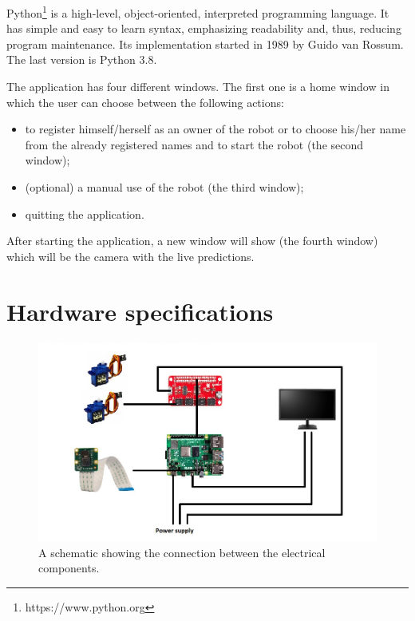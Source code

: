 \documentclass[runningheads,a4paper,12pt]{report}
\begin{document}
Python\footnote{https://www.python.org} is a high-level, object-oriented, interpreted programming language. It has simple and easy to learn syntax, emphasizing readability and, thus, reducing program maintenance. Its implementation started in 1989 by Guido van Rossum. The last version is Python 3.8.

The application has four different windows. The first one is a home window in which the user can choose between the following actions:

\begin{itemize}

\item to register himself/herself as an owner of the robot or to choose his/her name from the already registered names and to start the robot (the second window);

\item (optional) a manual use of the robot (the third window);

\item quitting the application.
\end{itemize}

After starting the application, a new window will show (the fourth window) which will be the camera with the live predictions.

\newpage

\section{Hardware specifications}
\begin{figure}[h]
	\centering

  	\includegraphics[width=\linewidth]{./images/3_electric_schematic}\hfill

    \caption{A schematic showing the connection between the electrical components.}  
    \label{fig:electrical_schematic}
\end{figure} 
\end{document}
